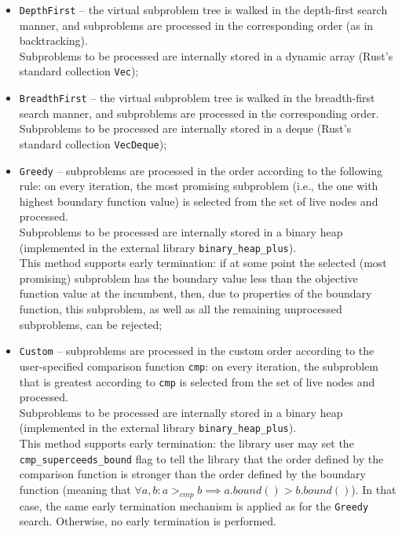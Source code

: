 \begin{itemize}
 \item \texttt{DepthFirst} -- the virtual subproblem tree is walked in the depth-first search
    manner, and subproblems are processed in the corresponding order (as in backtracking). \\
    Subproblems to be processed are internally stored in a dynamic array (Rust's standard
    collection \texttt{Vec});

 \item \texttt{BreadthFirst} -- the virtual subproblem tree is walked in the breadth-first
    search manner, and subproblems are processed in the corresponding order. \\
    Subproblems to be processed are internally stored in a deque (Rust's standard collection
    \texttt{VecDeque});

 \item \texttt{Greedy} -- subproblems are processed in the order according to the following
    rule: on every iteration, the most promising subproblem (i.e., the one with highest
    boundary function value) is selected from the set of live nodes and processed. \\
    Subproblems to be processed are internally stored in a binary heap (implemented in the
    external library \texttt{binary\_heap\_plus}). \\
    This method supports early termination: if at some point the selected (most promising)
    subproblem has the boundary value less than the objective function value at the incumbent,
    then, due to properties of the boundary function, this subproblem, as well as all the
    remaining unprocessed subproblems, can be rejected;

 \item \texttt{Custom} -- subproblems are processed in the custom order according to the
    user-specified comparison function \texttt{cmp}: on every iteration, the subproblem that
    is greatest according to \texttt{cmp} is selected from the set of live nodes and
    processed. \\
    Subproblems to be processed are internally stored in a binary heap (implemented in the
    external library \texttt{binary\_heap\_plus}). \\
    \sloppy
    This method supports early termination: the library user may set the
    \texttt{cmp\_superceeds\_bound} flag to tell the library that the order defined by
    the comparison function is stronger than the order defined by the boundary function
    (meaning that ${\forall a, b: a >_{cmp} b \implies a.bound() > b.bound()}$).
    In that case, the same early termination mechanism is applied as for the \texttt{Greedy}
    search. Otherwise, no early termination is performed.
\end{itemize}

